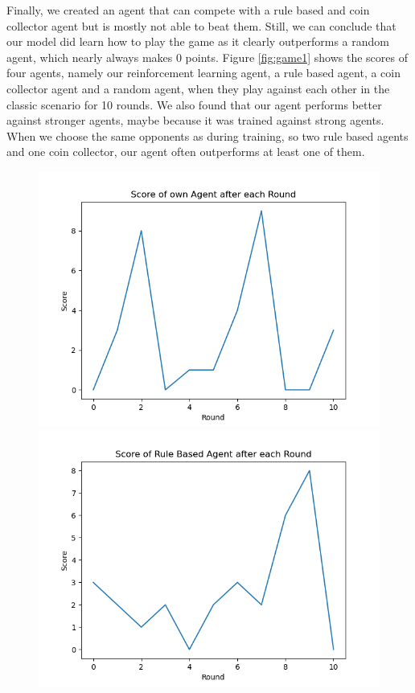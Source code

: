 Finally, we created an agent that can compete with a rule based and coin collector agent but is mostly not able to beat them. Still, we can conclude that our model did learn how to play the game as it clearly outperforms a random agent, which nearly always makes 0 points. Figure \ref{fig:game1} shows the scores of four agents, namely our reinforcement learning agent, a rule based agent, a coin collector agent and a random agent, when they play against each other in the classic scenario for 10 rounds. We also found that our agent performs better against stronger agents, maybe because it was trained against strong agents. When we choose the same opponents as during training, so two rule based agents and one coin collector, our agent often outperforms at least one of them.
\begin{figure}[H]
	\centering
	\begin{minipage}{0.49\textwidth}
		\centering
		\includegraphics[scale=0.52]{images/my_scores11_1.png}
	\end{minipage}
	\begin{minipage}{0.49\textwidth}
		\centering
		\includegraphics[scale=0.52]{images/rule_scores11_1.png}

\end{minipage}
\end{figure}
